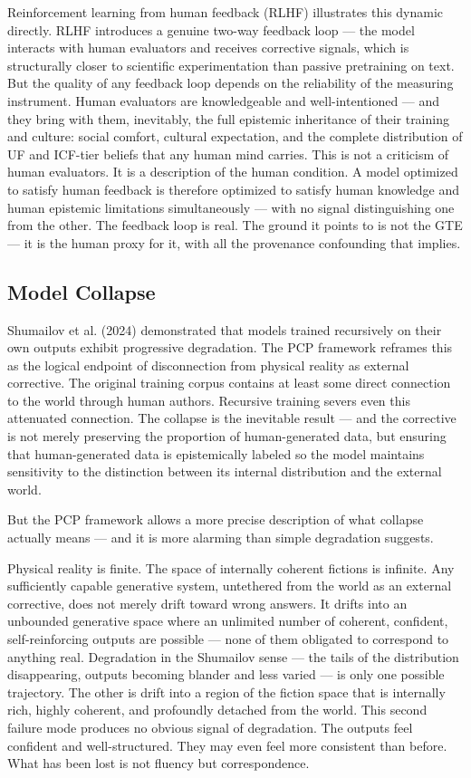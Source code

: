 \documentclass[12pt]{article}
\begin{document}
Reinforcement learning from human feedback (RLHF) illustrates this
dynamic directly. RLHF introduces a genuine two-way feedback loop ---
the model interacts with human evaluators and receives corrective
signals, which is structurally closer to scientific experimentation than
passive pretraining on text. But the quality of any feedback loop
depends on the reliability of the measuring instrument. Human evaluators
are knowledgeable and well-intentioned --- and they bring with them,
inevitably, the full epistemic inheritance of their training and
culture: social comfort, cultural expectation, and the complete
distribution of UF and ICF-tier beliefs that any human mind carries.
This is not a criticism of human evaluators. It is a description of the
human condition. A model optimized to satisfy human feedback is
therefore optimized to satisfy human knowledge and human epistemic
limitations simultaneously --- with no signal distinguishing one from
the other. The feedback loop is real. The ground it points to is not the
GTE --- it is the human proxy for it, with all the provenance
confounding that implies.

\subsection{Model Collapse}\label{model-collapse}

Shumailov et al. (2024) demonstrated that models trained recursively on
their own outputs exhibit progressive degradation. The PCP framework
reframes this as the logical endpoint of disconnection from physical
reality as external corrective. The original training corpus contains at
least some direct connection to the world through human authors.
Recursive training severs even this attenuated connection. The collapse
is the inevitable result --- and the corrective is not merely preserving
the proportion of human-generated data, but ensuring that
human-generated data is epistemically labeled so the model maintains
sensitivity to the distinction between its internal distribution and the
external world.

But the PCP framework allows a more precise description of what collapse
actually means --- and it is more alarming than simple degradation
suggests.

Physical reality is finite. The space of internally coherent fictions is
infinite. Any sufficiently capable generative system, untethered from
the world as an external corrective, does not merely drift toward wrong
answers. It drifts into an unbounded generative space where an unlimited
number of coherent, confident, self-reinforcing outputs are possible ---
none of them obligated to correspond to anything real. Degradation in
the Shumailov sense --- the tails of the distribution disappearing,
outputs becoming blander and less varied --- is only one possible
trajectory. The other is drift into a region of the fiction space that
is internally rich, highly coherent, and profoundly detached from the
world. This second failure mode produces no obvious signal of
degradation. The outputs feel confident and well-structured. They may
even feel more consistent than before. What has been lost is not fluency
but correspondence.
\end{document}
